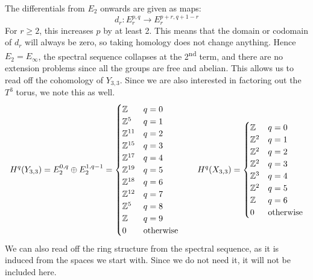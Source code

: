 The differentials from $E_2$ onwards are given as maps:
\[ d_r : E_r^{p,q} \to E_r^{p+r,q+1-r} \]
For $r\geq 2$, this increases $p$ by at least 2. This means that
the domain or codomain of $d_r$ will always be zero, so taking
homology does not change anything. Hence $E_2 = E_\infty$, the
spectral sequence collapses at the 2\textsuperscript{nd} term, and
there are no extension problems since all the groups are free and
abelian. This allows us to read off the cohomology of $Y_{3,3}$. Since
we are also interested in factoring out the $T^3$ torus, we note this
as well.
\[ H^q(Y_{3,3}) = E_2^{0,q} \oplus E_2^{1,q-1} = 
\begin{cases}
  \mathbb{Z} & q = 0 \\
  \mathbb{Z}^{5} & q = 1\\
  \mathbb{Z}^{11} & q = 2\\
  \mathbb{Z}^{15} & q = 3\\
  \mathbb{Z}^{17} & q = 4\\
  \mathbb{Z}^{19} & q = 5\\
  \mathbb{Z}^{18} & q = 6\\
  \mathbb{Z}^{12} & q = 7\\
  \mathbb{Z}^{5} & q = 8\\
  \mathbb{Z} & q = 9\\
  0 & \text{otherwise} 
\end{cases} \qquad
H^q(X_{3,3}) =
\begin{cases}
  \mathbb{Z} & q = 0 \\
  \mathbb{Z}^{2} & q=1 \\
  \mathbb{Z}^{2} & q=2 \\
  \mathbb{Z}^{2} & q=3 \\
  \mathbb{Z}^{3} & q=4 \\
  \mathbb{Z}^{2} & q=5 \\
  \mathbb{Z} & q=6 \\
  0 & \text{otherwise}
\end{cases}
\]
We can also read off the ring structure from the spectral sequence, as
it is induced from the spaces we start with. Since we do not
need it, it will not be included here.


